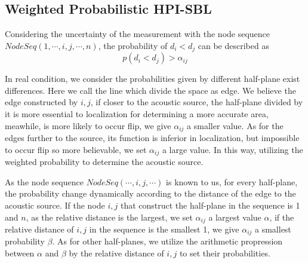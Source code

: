 \subsection{Weighted Probabilistic HPI-SBL}

 Considering the uncertainty of the measurement with the node sequence $NodeSeq( 1,\cdots ,i,j, \cdots,n )$, the probability of ${d_i} < {d_j}$ can be described as  
 \begin{equation}\label{eq1}
 p({d_i} < {d_j})>\alpha_{ij}
 \end{equation}

 In real condition, we consider the probabilities given by different half-plane exist differences. Here we call the line which divide the space as edge. We believe the edge constructed by $i,j$, if closer to the acoustic source, the half-plane divided by it is more essential to localization for determining a more accurate area, meawhile, is more likely to occur flip, we give $\alpha_{ij}$ a smaller value. As for the edges further to the source, its function is inferior in localization, but impossible to occur flip so more believable, we set $\alpha_{ij}$ a large value. In this way, utilizing the weighted probability to determine the acoustic source.
 
As the node sequence $NodeSeq( \cdots ,i,j, \cdots )$ is known to us, for every half-plane, the probability change dynamically according to the distance of the edge to the acoustic source. If the node $i,j$ that construct the half-plane in the sequence is 1 and $n$, as the relative distance is the largest, we set $\alpha_{ij}$ a largest value $\alpha$, if the relative distance of $i,j$ in the sequence is the smallest 1, we give $\alpha_{ij}$ a smallest probability $\beta$. As for other half-planes, we utilize the arithmetic propression between $\alpha$ and $\beta$ by the relative distance of $i,j$ to set their probabilities.


